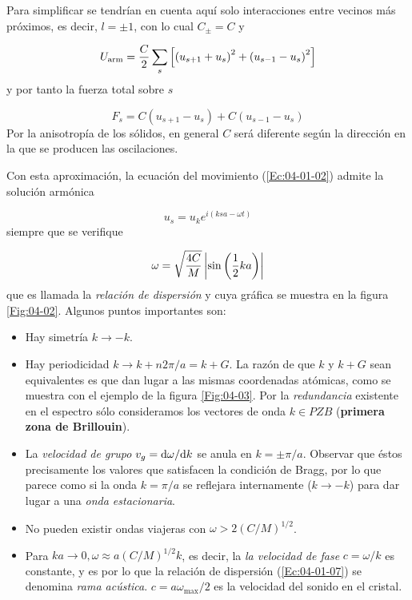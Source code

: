 Para simplificar se tendrían en cuenta aquí solo interacciones entre vecinos más próximos, es decir, $l=\pm 1$, con lo cual $C_\pm = C$ y 

\begin{equation}
	U_{\text{arm}} = \frac{C}{2} \sum_s \left[ \left( u_{s+1}+u_s \right)^2+\left( u_{s-1}-u_s \right)^2 \right]
\end{equation}
y por tanto la fuerza total sobre $s$ 

\begin{equation}
	F_s = C (u_{s+1}-u_s) + C(u_{s-1}-u_s)
\end{equation}
Por la anisotropía de los sólidos, en general $C$ será diferente según la dirección en la que se producen las oscilaciones. 

Con esta aproximación, la ecuación del movimiento (\ref{Ec:04-01-02}) admite la solución armónica

\begin{equation}
	u_s = u_k e^{i(ksa-\omega t)}
\end{equation}
siempre que se verifique 

\begin{equation}
	\omega = \sqrt{\frac{4C}{M}} \left| \sin \left( \frac{1}{2} k a \right) \right| \label{Ec:04-01-07}
\end{equation}
que es llamada la \textit{relación de dispersión} y cuya gráfica se muestra en la figura \ref{Fig:04-02}. Algunos puntos importantes son:

\begin{itemize}
	\item Hay simetría $k\rightarrow -k$.
	\item Hay periodicidad $k\rightarrow k+n2\pi/a=k+G$. La razón de que $k$ y $k+G$ sean equivalentes es que dan lugar a las mismas coordenadas atómicas, como se muestra con el ejemplo de la figura \ref{Fig:04-03}. Por la \textit{redundancia} existente en el espectro sólo consideramos los vectores de onda $k \in PZB$ (\textbf{primera zona de Brillouin}).
	\item La \textit{velocidad de grupo} $v_g = \mathrm{d}\omega / \mathrm{d} k$ se anula en $k=\pm \pi/a$. Observar que éstos precisamente los valores que satisfacen la condición de Bragg, por lo que parece como si la onda $k=\pi / a$ se reflejara internamente ($k \rightarrow -k$) para dar lugar a una \textit{onda estacionaria}.
	\item No pueden existir ondas viajeras con $\omega>2 (C/M)^{1/2}$.
	\item Para $ka\rightarrow 0, \omega \approx a(C/M)^{1/2}k$, es decir, la \textit{la velocidad de fase} $c=\omega /k$ es constante, y es por lo que la relación de dispersión (\ref{Ec:04-01-07}) se denomina \textit{rama acústica}. $c=a \omega_{\max} /2$ es la velocidad del sonido en el cristal.
\end{itemize}


